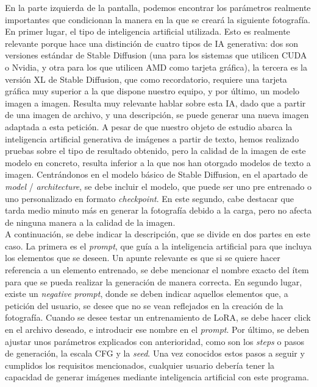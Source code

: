  En la parte izquierda de la pantalla, podemos encontrar los parámetros realmente importantes que condicionan la manera en la que se creará la siguiente fotografía. En primer lugar, el tipo de inteligencia artificial utilizada. Esto es realmente relevante porque hace una distinción de cuatro tipos de IA generativa: dos son versiones estándar de Stable Diffusion (una para los sistemas que utilicen CUDA o Nvidia, y otra para los que utilicen AMD como tarjeta gráfica), la tercera es la versión XL de Stable Diffusion, que como recordatorio, requiere una tarjeta gráfica muy superior a la que dispone nuestro equipo, y por último, un modelo imagen a imagen. Resulta muy relevante hablar sobre esta IA, dado que a partir de una imagen de archivo, y una descripción, se puede generar una nueva imagen adaptada a esta petición. A pesar de que nuestro objeto de estudio abarca la inteligencia artificial generativa de imágenes a partir de texto, hemos realizado pruebas sobre el tipo de resultado obtenido, pero la calidad de la imagen de este modelo en concreto, resulta inferior a la que nos han otorgado modelos de texto a imagen. Centrándonos en el modelo básico de Stable Diffusion, en el apartado de \textit{model} / \textit{architecture}, se debe incluir el modelo, que puede ser uno pre entrenado o uno personalizado en formato \textit{checkpoint}. En este segundo, cabe destacar que tarda medio minuto más en generar la fotografía debido a la carga, pero no afecta de ninguna manera a la calidad de la imagen. \\
 
 A continuación, se debe indicar la descripción, que se divide en dos partes en este caso. La primera es el \textit{prompt}, que guía a la inteligencia artificial para que incluya los elementos que se deseen. Un apunte relevante es que si se quiere hacer referencia a un elemento entrenado, se debe mencionar el nombre exacto del ítem para que se pueda realizar la generación de manera correcta. En segundo lugar, existe un \textit{negative prompt}, donde se deben indicar aquellos elementos que, a petición del usuario, se desee que no se vean reflejados en la creación de la fotografía. Cuando se desee testar un entrenamiento de LoRA, se debe hacer click en el archivo deseado, e introducir ese nombre en el \textit{prompt}. Por último, se deben ajustar unos parámetros explicados con anterioridad, como son los \textit{steps} o pasos de generación, la escala CFG y la \textit{seed}. Una vez conocidos estos pasos a seguir y cumplidos los requisitos mencionados, cualquier usuario debería tener la capacidad de generar imágenes mediante inteligencia artificial con este programa.\\

